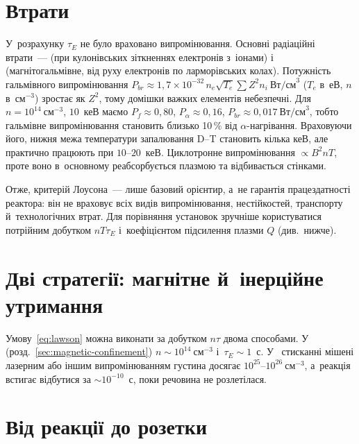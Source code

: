 \section{Втрати}

У~розрахунку $\tau_E$ не було враховано випромінювання. Основні радіаційні втрати~---
 (при кулонівських зіткненнях електронів з~іонами) і~
(магнітогальмівне, від руху електронів по ларморівських колах). Потужність гальмівного
випромінювання $P_{br}\approx1{,}7\times10^{-32}\,n_e\sqrt{T_e}\sum
Z^2n_i~\mathrm{Вт/см}^3$ ($T_e$ в~еВ, $n$ в~$\mathrm{см}^{-3}$) зростає як $Z^2$, тому
домішки важких елементів небезпечні. Для $n=10^{14}~\mathrm{см}^{-3}$, $10$~кеВ маємо
$P_f\approx0{,}80$, $P_\alpha\approx0{,}16$, $P_{br}\approx0{,}017~\mathrm{Вт/см}^3$,
тобто гальмівне випромінювання становить близько 10\,\% від $\alpha$-нагрівання.
Враховуючи його, нижня межа температури запалювання D--T становить кілька кеВ, але
практично працюють при $10$--$20$~кеВ. Циклотронне випромінювання $\propto B^2nT$, проте
воно в~основному реабсорбується плазмою та відбивається стінками.

Отже, критерій Лоусона~--- лише базовий орієнтир, а~не гарантія працездатності реактора:
він не враховує всіх видів випромінювання, нестійкостей, транспорту й~технологічних втрат.
Для порівняння установок зручніше користуватися потрійним добутком $nT\tau_E$
і~коефіцієнтом підсилення плазми $Q$ (див.~нижче).

\section{Дві стратегії: магнітне й~інерційне утримання}

Умову~\eqref{eq:lawson} можна виконати за добутком $n\tau$ двома способами.
У~ (розд.~\ref{sec:magnetic-confinement})
$n\sim10^{14}~\mathrm{см}^{-3}$ і~$\tau_E\sim1$~с. У~ стисканні
мішені лазерним або іншим випромінюванням густина досягає
$10^{25}$--$10^{26}~\mathrm{см}^{-3}$, а~реакція встигає відбутися за $\sim10^{-10}$~с,
поки речовина не розлетілася.

\section{Від реакції до розетки}

